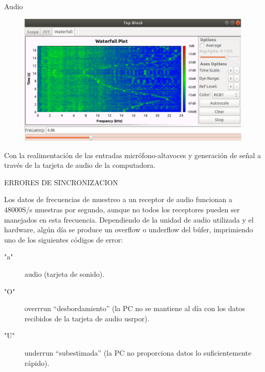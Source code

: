 \begin{frame}{Audio}

\begin{figure}
\begin{center}
\vspace{-8mm}
\includegraphics[width=\textwidth, height=0.6\paperheight]{parte1/lab3/pdf/lab3_10.pdf}
\end{center}
\end{figure}
\vspace{-5mm}
Con la realimentación de las entradas micrófono-altavoces y generación de señal a través de la tarjeta de audio de la computadora.

\end{frame}

\begin{frame}{ERRORES DE SINCRONIZACION}

Los datos de frecuencias de muestreo a un receptor de audio funcionan a 48000S/s muestras por segundo, aunque no todos los receptores pueden ser manejados en esta frecuencia. Dependiendo de la unidad de audio utilizada y el hardware, algún día se produce un overflow o underflow del búfer, imprimiendo uno de los siguientes códigos de error:\\ \vspace{2mm}


\begin{description}
   
\item["a"] audio (tarjeta de sonido).\\ \vspace{2mm}
\item["O"]overrrun “desbordamiento” (la PC no se mantiene al día con los datos recibidos de la tarjeta de audio usrpor). \\ \vspace{2mm}
\item["U"] underrun “subestimada” (la PC no proporciona datos lo suficientemente rápido).\\ \vspace{2mm}


\end{description}

\end{frame}

